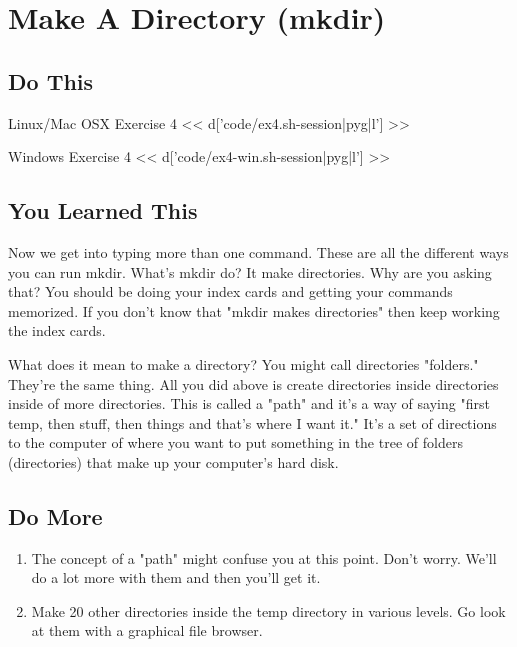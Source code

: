 \chapter{Make A Directory (mkdir)}

\section{Do This}

\begin{code}{Linux/Mac OSX Exercise 4}
<< d['code/ex4.sh-session|pyg|l'] >>
\end{code}

\begin{code}{Windows Exercise 4}
<< d['code/ex4-win.sh-session|pyg|l'] >>
\end{code}

\section{You Learned This}

Now we get into typing more than one command.  These are all the different ways
you can run mkdir.  What's mkdir do?  It make directories.  Why are you asking
that?  You should be doing your index cards and getting your commands memorized.
If you don't know that "mkdir makes directories" then keep working the index
cards.

What does it mean to make a directory?  You might call directories "folders."  They're
the same thing.  All you did above is create directories inside directories
inside of more directories.  This is called a "path" and it's a way of saying
"first temp, then stuff, then things and that's where I want it."  It's a
set of directions to the computer of where you want to put something in the tree
of folders (directories) that make up your computer's hard disk.

\section{Do More}

\begin{enumerate}
\item The concept of a "path" might confuse you at this point.  Don't worry. We'll 
    do a lot more with them and then you'll get it.
\item Make 20 other directories inside the temp directory in various levels.  Go look at them
    with a graphical file browser.
\end{enumerate}


